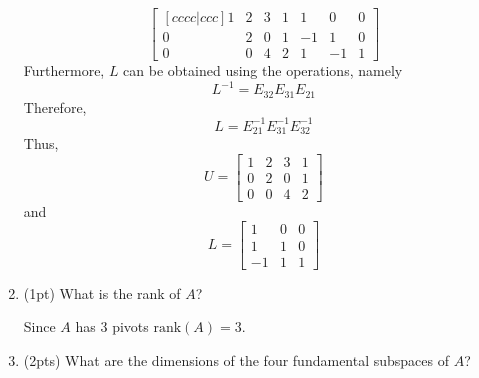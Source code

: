 \begin{enumerate}[label=(\alph*)]
\begin{mdframed}[style=MyFrame]
\begin{equation}
                \begin{bmatrix}[cccc|ccc]
                    1   &   2   &   3   &   1   &   1   &   0   &   0   \\
                    0   &   2   &   0   &   1   &   -1  &   1   &   0   \\
                    0   &   0   &   4   &   2   &   1   &   -1  &   1   
                \end{bmatrix}
            \end{equation}
            Furthermore, $L$ can be obtained using the operations, namely
            \begin{equation}
                L^{-1} = E_{32}E_{31}E_{21}
            \end{equation}
            Therefore,
            \begin{equation}
                L = E_{21}^{-1} E_{31}^{-1} E_{32}^{-1}
            \end{equation}
            Thus,
            \begin{equation}
                U = 
                \begin{bmatrix}
                    1   &   2   &   3   &   1   \\
                    0   &   2   &   0   &   1   \\
                    0   &   0   &   4   &   2
                \end{bmatrix}
            \end{equation}
            and 
            \begin{equation}
                L =
                \begin{bmatrix}
                    1   &   0   &   0   \\
                    1   &   1   &   0   \\
                    -1  &   1   &   1
                \end{bmatrix}
            \end{equation}
        \end{mdframed}
    \item (1pt) What is the rank of $A$?
        \begin{mdframed}[style=MyFrame]
            Since $A$ has 3 pivots $\text{rank}(A)=3$.
        \end{mdframed}
    \item (2pts) What are the dimensions of the four fundamental subspaces
        of $A$?
        \begin{mdframed}[style=MyFrame]

\end{mdframed}
\end{enumerate}
